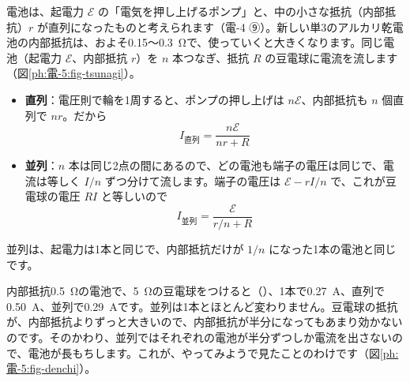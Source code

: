 
\leavevmode\label{ph:電-5:sec2}電池は、起電力 $\mathcal E$ の「電気を押し上げるポンプ」と、中の小さな抵抗（内部抵抗）$r$ が直列になったものと考えられます（電-4 ⑨）。新しい単3のアルカリ乾電池の内部抵抗は、およそ0.15〜\qty{0.3}{\ohm}で、使っていくと大きくなります。同じ電池（起電力 $\mathcal E$、内部抵抗 $r$）を $n$ 本つなぎ、抵抗 $R$ の豆電球に電流を流します（図\ref{ph:電-5:fig-tsunagi}）。

\begin{bkfigure}
\label{ph:電-5:fig-tsunagi}
\end{bkfigure}


\begin{itemize}[leftmargin=1.2\zw, itemsep=2pt, topsep=2pt, label={\color{bkTheme}●}]
\item \textbf{直列}：電圧則で輪を1周すると、ポンプの押し上げは $n\mathcal E$、内部抵抗も $n$ 個直列で $nr$。だから
\[ I_{\text{直列}}=\frac{n\mathcal E}{nr+R} \]
\item \textbf{並列}：$n$ 本は同じ2点の間にあるので、どの電池も端子の電圧は同じで、電流は等しく $I/n$ ずつ分けて流します。端子の電圧は $\mathcal E-rI/n$ で、これが豆電球の電圧 $RI$ と等しいので
\[ I_{\text{並列}}=\frac{\mathcal E}{r/n+R} \]
\end{itemize}
並列は、起電力は1本と同じで、内部抵抗だけが $1/n$ になった1本の電池と同じです。



\noindent 内部抵抗\qty{0.5}{\ohm}の電池で、\qty{5}{\ohm}の豆電球をつけると（）、1本で\qty{0.27}{A}、直列で\qty{0.50}{A}、並列で\qty{0.29}{A}です。並列は1本とほとんど変わりません。豆電球の抵抗が、内部抵抗よりずっと大きいので、内部抵抗が半分になってもあまり効かないのです。そのかわり、並列ではそれぞれの電池が半分ずつしか電流を出さないので、電池が長もちします。これが、やってみようで見たことのわけです（図\ref{ph:電-5:fig-denchi}）。

